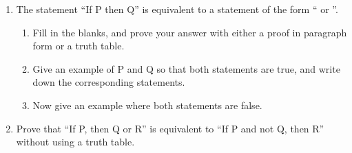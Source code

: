 \begin{enumerate}

    \item The statement ``If P then Q'' is equivalent to a statement of the form ``\underline{\hspace{.5in}} or \underline{\hspace{.5in}}''.
  \begin{enumerate}
      \item Fill in the blanks, and prove your answer with either a proof in paragraph form or a truth table.
      \item Give an example of P and Q so that both statements are true, and write down the corresponding statements.
      \item Now give an example where both statements are false.
  \end{enumerate}

    \item Prove that ``If P, then Q or R'' is equivalent to ``If P and not Q, then R'' without using a truth table.
\end{enumerate}
